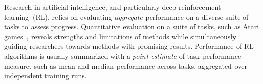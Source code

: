
Research in artificial intelligence, and particularly deep reinforcement learning~(RL), relies on evaluating \emph{aggregate} performance on a diverse suite of tasks to assess progress. Quantitative evaluation on a suite of tasks, such as Atari games~\citep{bellemare2013arcade}, reveals strengths and limitations of methods while simultaneously guiding researchers towards methods with promising results. 
Performance of RL algorithms is usually summarized with a \emph{point estimate} of task performance measure, such as mean and median performance across tasks, aggregated over independent training runs. %





